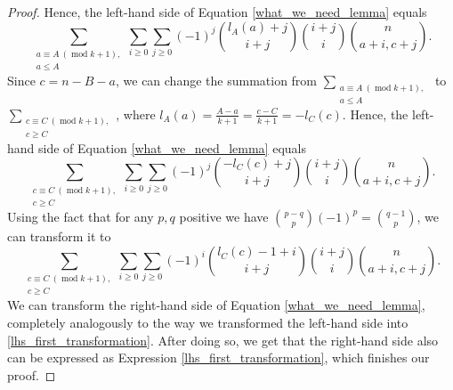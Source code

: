 \documentclass[11pt, reqno]{amsart}
\numberwithin{equation}{section}
\newcommand\modd{\operatorname{mod}}
\begin{document}
\begin{proof}
    Hence, the left-hand side of Equation \ref{what_we_need_lemma} equals
    \begin{equation}
    \label{lhs_first_transformation}
        \sum_{\substack{a \equiv A \ (\modd k+1), \\ a \leqslant A}} \sum_{i \geqslant 0} \sum_{j \geqslant 0}  (-1)^j \binom{l_A(a)+j}{i + j}\binom{i+j}{i}\binom{n}{a+i, c+j}.
    \end{equation}
    Since $c=n-B-a$, we can change the summation from $\sum_{\substack{a \equiv A \ (\modd k+1), \\ a \leqslant A}}$ to $\sum_{\substack{c \equiv C \ (\modd k+1), \\ c \geqslant C}}$, where $l_A(a)=\frac{A-a}{k+1}=\frac{c-C}{k+1}=-l_C(c)$. Hence, the left-hand side of Equation \ref{what_we_need_lemma} equals
    \begin{equation*}
        \sum_{\substack{c \equiv C \ (\modd k+1), \\ c \geqslant C}} \sum_{i \geqslant 0} \sum_{j \geqslant 0} (-1)^j \binom{-l_C(c)+j}{i+j}\binom{i+j}{i}\binom{n}{a+i, c+j}.
    \end{equation*}
    Using the fact that for any $p, q$ positive we have $\binom{p-q}{p}(-1)^p=\binom{q-1}{p}$, we can transform it to
    \begin{equation}
    \label{expression_lhs}
        \sum_{\substack{c \equiv C \ (\modd k+1), \\ c \geqslant C}} \sum_{i \geqslant 0} \sum_{j \geqslant 0} (-1)^i \binom{l_C(c)-1+i}{i+j}\binom{i+j}{i}\binom{n}{a+i, c+j}.
    \end{equation}
    We can transform the right-hand side of Equation \ref{what_we_need_lemma}, completely analogously to the way we transformed the left-hand side into \ref{lhs_first_transformation}. After doing so, we get that the right-hand side also can be expressed as Expression \ref{lhs_first_transformation}, which finishes our proof.
\end{proof}

\symmetrylemma*
\end{document}
